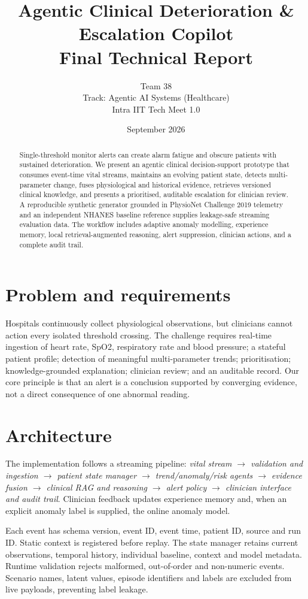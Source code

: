 \documentclass[11pt,a4paper]{article}
\title{\textbf{Agentic Clinical Deterioration \& Escalation Copilot}\\[0.4em]\large Final Technical Report}
\author{Team 38\\Track: Agentic AI Systems (Healthcare)\\Intra IIT Tech Meet 1.0}
\date{September 2026}
\begin{document}
\maketitle
\begin{abstract}
Single-threshold monitor alerts can create alarm fatigue and obscure patients with sustained deterioration. We present an agentic clinical decision-support prototype that consumes event-time vital streams, maintains an evolving patient state, detects multi-parameter change, fuses physiological and historical evidence, retrieves versioned clinical knowledge, and presents a prioritised, auditable escalation for clinician review. A reproducible synthetic generator grounded in PhysioNet Challenge 2019 telemetry and an independent NHANES baseline reference supplies leakage-safe streaming evaluation data. The workflow includes adaptive anomaly modelling, experience memory, local retrieval-augmented reasoning, alert suppression, clinician actions, and a complete audit trail.
\end{abstract}

\section{Problem and requirements}
Hospitals continuously collect physiological observations, but clinicians cannot action every isolated threshold crossing. The challenge requires real-time ingestion of heart rate, SpO2, respiratory rate and blood pressure; a stateful patient profile; detection of meaningful multi-parameter trends; prioritisation; knowledge-grounded explanation; clinician review; and an auditable record. Our core principle is that an alert is a conclusion supported by converging evidence, not a direct consequence of one abnormal reading.

\section{Architecture}
The implementation follows a streaming pipeline: \emph{vital stream $\rightarrow$ validation and ingestion $\rightarrow$ patient state manager $\rightarrow$ trend/anomaly/risk agents $\rightarrow$ evidence fusion $\rightarrow$ clinical RAG and reasoning $\rightarrow$ alert policy $\rightarrow$ clinician interface and audit trail}. Clinician feedback updates experience memory and, when an explicit anomaly label is supplied, the online anomaly model.

Each event has schema version, event ID, event time, patient ID, source and run ID. Static context is registered before replay. The state manager retains current observations, temporal history, individual baseline, context and model metadata. Runtime validation rejects malformed, out-of-order and non-numeric events. Scenario names, latent values, episode identifiers and labels are excluded from live payloads, preventing label leakage.
\end{document}
